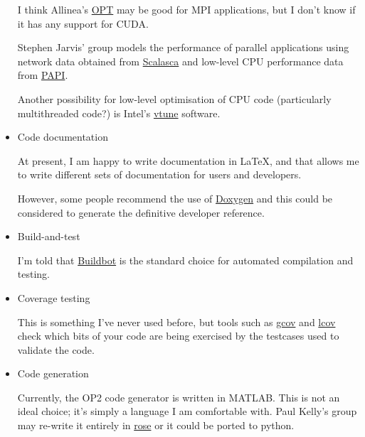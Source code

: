 \documentclass[12pt]{article}
\begin{document}
\begin{itemize}
I think Allinea's
\href{http://www.allinea.com/?page=74}{OPT}
may be good for MPI applications, but I don't know if it has 
any support for CUDA.

Stephen Jarvis' group models the performance of parallel 
applications using network data obtained from
\href{http://www.fz-juelich.de/jsc/scalasca/}{Scalasca}
and low-level CPU performance data from
\href{http://icl.cs.utk.edu/papi/}{PAPI}.

Another possibility for low-level optimisation of CPU code
(particularly multithreaded code?) is Intel's
\href{http://software.intel.com/en-us/intel-vtune/}{vtune}
software.


\item
Code documentation

At present, I am happy to write documentation in LaTeX, and
that allows me to write different sets of documentation for
users and developers.

However, some people recommend the use of
\href{http://sourceforge.net/projects/doxygen/}{Doxygen}
and this could be considered to generate the 
definitive developer reference.

\item
Build-and-test

I'm told that 
\href{http://buildbot.net/trac}{Buildbot} 
is the standard choice for automated compilation and testing.


\item
Coverage testing

This is something I've never used before, but tools such as
\href{http://gcc.gnu.org/onlinedocs/gcc/Gcov.html}{gcov}
and
\href{http://ltp.sourceforge.net/coverage/lcov.php}{lcov}
check which bits of your code are being exercised by the testcases 
used to validate the code.


\item
Code generation

Currently, the OP2 code generator is written in MATLAB.
This is not an ideal choice; it's simply a language I am 
comfortable with. Paul Kelly's group may re-write it 
entirely in
\href{http://www.rosecompiler.org/}{rose}
or it could be ported to python.

\end{itemize}
\end{document}
